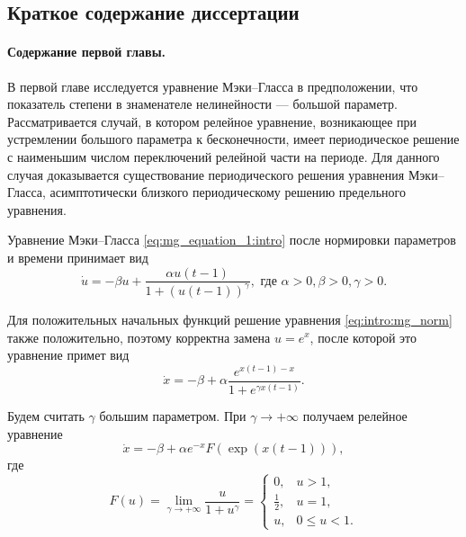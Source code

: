 \bigskip

\subsection*{Краткое содержание диссертации}

\paragraph{Содержание первой главы.} В первой главе исследуется уравнение Мэки--Гласса в предположении, что показатель степени в знаменателе нелинейности --- большой параметр. Рассматривается случай, в котором релейное уравнение, возникающее при устремлении большого параметра к бесконечности, имеет периодическое решение с наименьшим числом переключений релейной части на периоде. Для данного случая доказывается существование периодического решения уравнения Мэки--Гласса, асимптотически близкого периодическому решению предельного уравнения.

Уравнение Мэки--Гласса \eqref{eq:mg_equation_1:intro} после нормировки параметров и времени принимает вид
\begin{equation}
	\label{eq:intro:mg_norm}
	\dot{u}=-\beta u+\frac{\alpha u(t-1)}{1+(u(t-1))^\gamma}, \text{ где } \alpha > 0, \beta > 0, \gamma > 0.
\end{equation}

Для положительных начальных функций решение уравнения \eqref{eq:intro:mg_norm} также положительно, поэтому корректна замена $u = e^x$, после которой это уравнение примет вид
\begin{equation}
	\label{eq:intro:MG_x}
	\dot{x}=-\beta+\alpha\frac{e^{x(t-1)-x}}{1+e^{\gamma x(t-1)}}.
\end{equation}

Будем считать $\gamma$ большим параметром. При $\gamma \to +\infty$ получаем релейное уравнение
\begin{equation}
	\label{eq:intro:MG_rele}
	\dot{x}=-\beta + \alpha e^{-x} F(\exp({x(t-1)})),
\end{equation}
где
\begin{equation}
	\label{eq:intro:F}
	F(u)=\lim\limits_{\gamma\to +\infty}\frac{u}{1+u^{\gamma}}=
	\begin{cases}
		0, & u > 1,\\
		\frac{1}{2}, & u = 1,\\
		u, & 0 \leq u < 1.
	\end{cases}
\end{equation}

